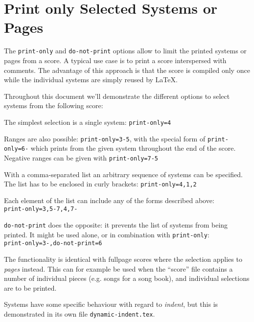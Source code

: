 \documentclass{lyluatexexample}
\begin{document}
\def\postLilyPondExample{\par\bigskip\hrule\par\bigskip}

\section*{Print only Selected Systems or Pages}

The \texttt{print-only} and \texttt{do-not-print} options allow to limit
the printed systems or pages from a score. A typical use case is to print
a score interspersed with comments.  The advantage of this approach is that
the score is compiled only once while the individual systems are simply
reused by \LaTeX.

Throughout this document we'll demonstrate the different options to
select systems from the following score:


The simplest selection is a single system: \texttt{print-only=4}


Ranges are also possible: \texttt{print-only=3-5}, with the special form of
\texttt{print-only=6-} which prints from the given system throughout the end of
the score. Negative ranges can be given with \texttt{print-only=7-5}




With a comma-separated list an arbitrary sequence of systems can be specified.
The list has to be enclosed in curly brackets: \texttt{print-only={4,1,2}}


Each element of the list can include any of the forms described above:\\
\texttt{print-only={3,5-7,4,7-}}


\texttt{do-not-print} does the opposite: it prevents the list of systems from
being printed. It might be used alone, or in combination with
\texttt{print-only}:\\
\texttt{print-only=3-,do-not-print=6}


The functionality is identical with fullpage scores where the selection applies
to \emph{pages} instead. This can for example be used when the “score” file
contains a number of individual pieces (e.g. songs for a song book), and
individual selections are to be printed.

Systems have some specific behaviour with regard to \emph{indent},
but this is demonstrated in its own file \texttt{dynamic-indent.tex}.

\let\postLilyPondExample\undefined
\end{document}
